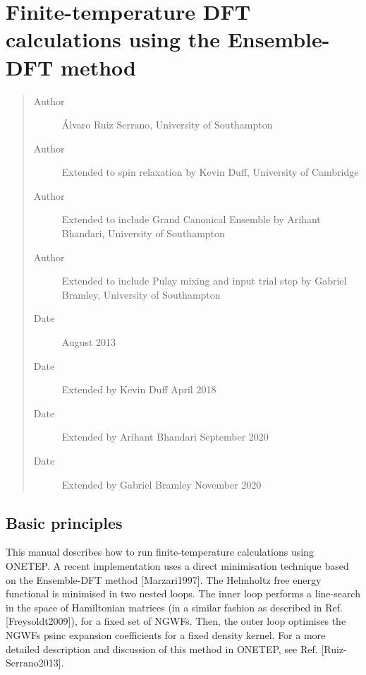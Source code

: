 \documentclass[letterpaper,10pt,english]{sphinxmanual}
\begin{document}
\section{Finite-temperature DFT calculations using the Ensemble-DFT method}
\label{\detokenize{onetep_edft_documentation:finite-temperature-dft-calculations-using-the-ensemble-dft-method}}\label{\detokenize{onetep_edft_documentation::doc}}\begin{quote}\begin{description}
\item[{Author}] \leavevmode
Álvaro Ruiz Serrano, University of Southampton

\item[{Author}] \leavevmode
Extended to spin relaxation by Kevin Duff, University of Cambridge

\item[{Author}] \leavevmode
Extended to include Grand Canonical Ensemble by Arihant Bhandari, University of Southampton

\item[{Author}] \leavevmode
Extended to include Pulay mixing and input trial step by Gabriel Bramley, University of Southampton

\item[{Date}] \leavevmode
August 2013

\item[{Date}] \leavevmode
Extended by Kevin Duff April 2018

\item[{Date}] \leavevmode
Extended by Arihant Bhandari September 2020

\item[{Date}] \leavevmode
Extended by Gabriel Bramley November 2020

\end{description}\end{quote}


\subsection{Basic principles}
\label{\detokenize{onetep_edft_documentation:basic-principles}}
This manual describes how to run finite-temperature calculations using
ONETEP. A recent implementation uses a direct minimisation technique
based on the Ensemble-DFT method
{[}Marzari1997{]}. The Helmholtz free energy
functional is minimised in two nested loops. The inner loop performs a
line-search in the space of Hamiltonian matrices (in a similar fashion
as described in Ref. {[}Freysoldt2009{]}), for
a fixed set of NGWFs. Then, the outer loop optimises the NGWFs psinc
expansion coefficients for a fixed density kernel. For a more detailed
description and discussion of this method in ONETEP, see Ref.
{[}Ruiz-Serrano2013{]}.
\end{document}
